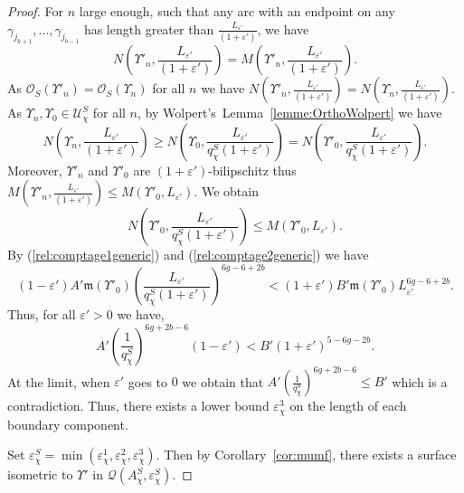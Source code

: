 \documentclass[a4paper,12pt]{article}
\theoremstyle{definition}
\theoremstyle{remark}
\begin{document}
\begin{proof}
    For $n$ large enough, such that any arc with an endpoint on any $\gamma_{j_{k+1}},...,\gamma_{j_{b-1}}$ has length greater than $\frac{L_{\varepsilon'}}{(1+\varepsilon')} $, we have 
    \[
        N \left( \Upsilon'_n, \frac{L_{\varepsilon'}}{(1+\varepsilon')} \right) = M\left( \Upsilon'_n,\frac{L_{\varepsilon'}}{(1+\varepsilon')} \right).
    \]
    As $\mathcal{O}_S(\Upsilon'_n)=\mathcal{O}_S(\Upsilon_n)$ for all $n$ we have $N \left( \Upsilon'_n, \frac{L_{\varepsilon'}}{(1+\varepsilon')} \right) = N \left( \Upsilon_n, \frac{L_{\varepsilon'}}{(1+\varepsilon')} \right)$. \\
    As $\Upsilon_n,\Upsilon_0 \in \mathcal{U}_\chi^S$ for all $n$, by Wolpert's~Lemma~\ref{lemme:OrthoWolpert} we have 
    \[
        N \left( \Upsilon_n, \frac{L_{\varepsilon'}}{(1+\varepsilon')} \right) \geqslant N \left( \Upsilon_0, \frac{L_{\varepsilon'}}{q_\chi^S(1+\varepsilon')} \right) = N \left( \Upsilon'_0, \frac{L_{\varepsilon'}}{q_\chi^S(1+\varepsilon')} \right).
    \]
    Moreover, $\Upsilon'_n$ and $\Upsilon'_0$ are $(1+\varepsilon')$-bilipschitz thus $M\left( \Upsilon'_n,\frac{L_{\varepsilon'}}{(1+\varepsilon')} \right) \leqslant M(\Upsilon'_0,L_{\varepsilon'})$. We obtain
    \[
        N \left( \Upsilon'_0,\frac{L_{\varepsilon'}}{q_\chi^S(1+\varepsilon')} \right) \leqslant M(\Upsilon'_0,L_{\varepsilon'}).
    \]
    By (\ref{rel:comptage1generic}) and (\ref{rel:comptage2generic}) we have
    \[
        (1-\varepsilon')A'\mathfrak{m}(\Upsilon'_0)\left( \frac{L_{\varepsilon'}}{q_\chi^S(1+\varepsilon')} \right)^{6g-6+2b} < (1+\varepsilon')B'\mathfrak{m}(\Upsilon'_0) L_{\varepsilon'}^{6g-6+2b}.
    \]
    Thus, for all $\varepsilon'>0$ we have,
    \[
        A' \left ( \frac{1}{q_\chi^S} \right)^{6g+2b-6}(1-\varepsilon') < B'(1+\varepsilon')^{5-6g-2b}.
    \]
    At the limit, when $\varepsilon'$ goes to $0$ we obtain that $A'\left ( \frac{1}{q_\chi^S} \right)^{6g+2b-6} \leqslant B'$ which is a contradiction. Thus, there exists a lower bound $\varepsilon_\chi^3$ on the length of each boundary component. 
    
    
    Set $\varepsilon_\chi^S=\min(\varepsilon_\chi^1,\varepsilon_\chi^2, \varepsilon_\chi^3)$. Then by Corollary~\ref{cor:mumf}, there exists a surface isometric to $\Upsilon'$ in $\mathcal{Q}(A_\chi^S,\varepsilon_\chi^S)$.
\end{proof}


\end{document}
